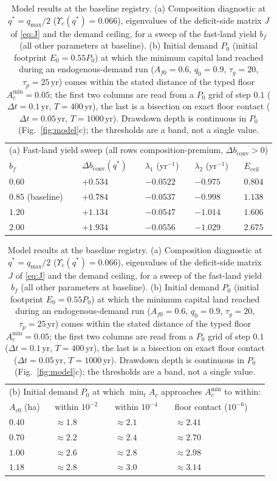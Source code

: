 \documentclass[preprint,12pt,authoryear]{elsarticle}
\newcommand{\dconv}{\Delta b_{\mathrm{conv}}}
\newcommand{\Ups}{\Upsilon_c}
\newcommand{\Eceil}{E_{\mathrm{ceil}}}
\newcommand{\Acmin}{A_c^{\min}}
\begin{document}
\begin{table}[!htbp]
\centering\small
\caption{Model results at the baseline registry. (a) Composition diagnostic at $q^*=q_{\max}/2$ ($\Ups(q^*)=0.066$), eigenvalues of the deficit-side matrix $J$ of \eqref{eq:J} and the demand ceiling, for a sweep of the fast-land yield $b_f$ (all other parameters at baseline). (b) Initial demand $P_0$ (initial footprint $E_0=0.55P_0$) at which the minimum capital land reached during an endogenous-demand run ($A_{f0}=0.6$, $q_0=0.9$, $\tau_g=20$, $\tau_p=25$\,yr) comes within the stated distance of the typed floor $\Acmin=0.05$; the first two columns are read from a $P_0$ grid of step $0.1$ ($\Delta t=0.1$\,yr, $T=400$\,yr), the last is a bisection on exact floor contact ($\Delta t=0.05$\,yr, $T=1000$\,yr). Drawdown depth is continuous in $P_0$ (Fig.~\ref{fig:model}c); the thresholds are a band, not a single value.}
\label{tab:model}
\begin{tabular}{l l l l l}
\toprule
\multicolumn{5}{l}{(a) Fast-land yield sweep (all rows composition-premium, $\dconv>0$)}\\
$b_f$ & $\dconv(q^*)$ & $\lambda_1$ (yr$^{-1}$) & $\lambda_2$ (yr$^{-1}$) & $\Eceil$ \\
\midrule
$0.60$ & $+0.534$ & $-0.0522$ & $-0.975$ & $0.804$ \\
$0.85$ (baseline) & $+0.784$ & $-0.0537$ & $-0.998$ & $1.138$ \\
$1.20$ & $+1.134$ & $-0.0547$ & $-1.014$ & $1.606$ \\
$2.00$ & $+1.934$ & $-0.0556$ & $-1.029$ & $2.675$ \\
\bottomrule
\end{tabular}

\medskip
\begin{tabular}{l l l l}
\toprule
\multicolumn{4}{l}{(b) Initial demand $P_0$ at which $\min_tA_c$ approaches $\Acmin$ to within:}\\
$A_{c0}$ (ha) & within $10^{-2}$ & within $10^{-4}$ & floor contact ($10^{-6}$) \\
\midrule
$0.40$ & $\approx1.8$ & $\approx2.1$ & $\approx2.41$ \\
$0.70$ & $\approx2.2$ & $\approx2.4$ & $\approx2.70$ \\
$1.00$ & $\approx2.6$ & $\approx2.8$ & $\approx2.98$ \\
$1.18$ & $\approx2.8$ & $\approx3.0$ & $\approx3.14$ \\
\bottomrule
\end{tabular}
\end{table}
\end{document}
